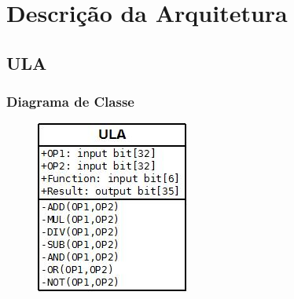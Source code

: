 \documentclass{report}
\begin{document}
\chapter{Descrição da Arquitetura}

  \section{ULA}

    \subsection{Diagrama de Classe}
  \begin{figure}[H]
     	\centering
     	\includegraphics[scale=1.5]{./pictures/diagrams/ula.jpeg}
  \end{figure}      
     
\end{document}
